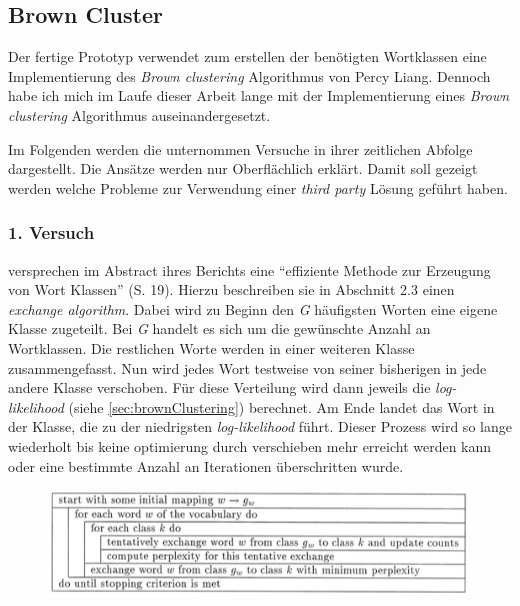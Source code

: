 \subsection{Brown Cluster}
    Der fertige Prototyp verwendet zum erstellen der benötigten Wortklassen eine Implementierung des \emph{Brown clustering} Algorithmus von Percy Liang. Dennoch habe ich mich im Laufe dieser Arbeit lange mit der Implementierung eines \emph{Brown clustering} Algorithmus auseinandergesetzt.
    
    Im Folgenden werden die unternommen Versuche in ihrer zeitlichen Abfolge dargestellt. Die Ansätze werden nur Oberflächlich erklärt. Damit soll gezeigt werden welche Probleme zur Verwendung einer \emph{third party} Lösung geführt haben.
        
    \subsubsection*{1. Versuch}

  		\cite{speechcommunication:exchange} versprechen im Abstract ihres Berichts eine \enquote{effiziente Methode zur Erzeugung von Wort Klassen} (S. 19). Hierzu beschreiben sie in Abschnitt 2.3 einen \emph{exchange algorithm}. Dabei wird zu Beginn den \emph{G} häufigsten Worten eine eigene Klasse zugeteilt. Bei \emph{G} handelt es sich um die gewünschte Anzahl an Wortklassen. Die restlichen Worte werden in einer weiteren Klasse zusammengefasst. Nun wird jedes Wort testweise von seiner bisherigen in jede andere Klasse verschoben. Für diese Verteilung wird dann jeweils die \emph{log-likelihood} (siehe \autoref{sec:brownClustering}) berechnet. Am Ende landet das Wort in der Klasse, die zu der niedrigsten \emph{log-likelihood} führt. Dieser Prozess wird so lange wiederholt bis keine optimierung durch verschieben mehr erreicht werden kann oder eine bestimmte Anzahl an Iterationen überschritten wurde.
            
		\begin{figure}[H]
			\centering
  			\includegraphics[width=.8\linewidth]{images/exchangeAlg.png}
  			\caption{\emph{} \parencite[S. 24 Abb. 1 ]{speechcommunication:exchange}}				
			\label{fig:exchangeAlgorythm}
		\end{figure}

